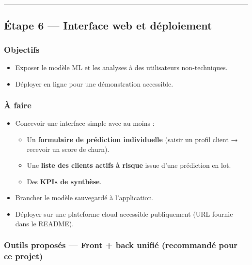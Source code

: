 \documentclass[11pt,a4paper]{article}
\providecommand{\tightlist}{\setlength{\itemsep}{0pt}\setlength{\parskip}{0pt}}
\begin{document}
\begin{center}\rule{0.5\linewidth}{0.5pt}\end{center}

\subsection{Étape 6 --- Interface web et
déploiement}\label{uxe9tape-6-interface-web-et-duxe9ploiement}

\subsubsection{Objectifs}\label{objectifs-6}

\begin{itemize}
\tightlist
\item
  Exposer le modèle ML et les analyses à des utilisateurs
  non-techniques.
\item
  Déployer en ligne pour une démonstration accessible.
\end{itemize}

\subsubsection{À faire}\label{uxe0-faire-6}

\begin{itemize}
\tightlist
\item
  Concevoir une interface simple avec au moins :

  \begin{itemize}
  \tightlist
  \item
    Un \textbf{formulaire de prédiction individuelle} (saisir un profil
    client → recevoir un score de churn).
  \item
    Une \textbf{liste des clients actifs à risque} issue d'une
    prédiction en lot.
  \item
    Des \textbf{KPIs de synthèse}.
  \end{itemize}
\item
  Brancher le modèle sauvegardé à l'application.
\item
  Déployer sur une plateforme cloud accessible publiquement (URL fournie
  dans le README).
\end{itemize}

\subsubsection{Outils proposés --- Front + back unifié (recommandé pour
ce
projet)}\label{outils-proposuxe9s-front-back-unifiuxe9-recommanduxe9-pour-ce-projet}
\end{document}
